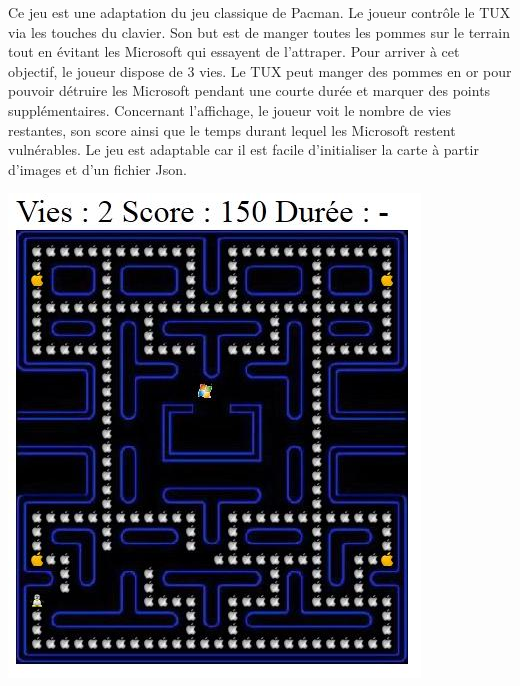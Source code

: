 \begin{minipage}{9cm}
Ce jeu est une adaptation du jeu classique de Pacman. 
Le joueur contrôle le TUX via les touches du clavier. 
Son but est de manger toutes les pommes sur le terrain tout en évitant les Microsoft qui essayent de l’attraper. 
Pour arriver à cet objectif, le joueur dispose de 3 vies. Le TUX peut manger des pommes en or pour pouvoir détruire les Microsoft pendant
une courte durée et marquer des points supplémentaires. Concernant l’affichage, le joueur voit le nombre de vies restantes, 
son score ainsi que le temps durant lequel les Microsoft restent vulnérables. Le jeu est adaptable car il est facile d’initialiser 
la carte à partir d’images et d’un fichier Json.
\end{minipage}
\hfill
\begin{minipage}{6cm}
 \includegraphics[width=\linewidth]{img/capturejeu_pacman}
\end{minipage}



